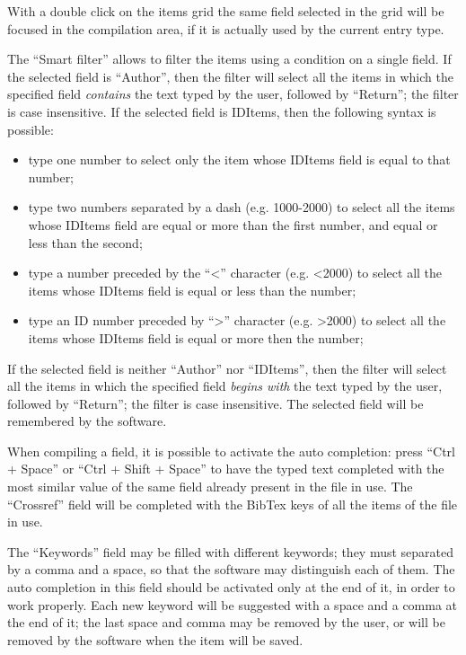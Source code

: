 \documentclass[a4paper,12pt]{report}
\begin{document}
With a double click on the items grid the same field selected in the grid will be focused in the compilation area, if it is actually used by the current entry type.

The “Smart filter” allows to filter the items using a condition on a single field. If the selected field is “Author”, then the filter will select all the items in which the specified field \textit{contains} the text typed by the user, followed by “Return”; the filter is case insensitive. If the selected field is IDItems, then the following syntax is possible:

\begin{itemize}
\item type one number to select only the item whose IDItems field is equal to that number;
\item type two numbers separated by a dash (e.g. 1000-2000) to select all the items whose IDItems field are equal or more than the first number, and equal or less than the second;
\item type a number preceded by the “<” character (e.g. <2000) to select all the items whose IDItems field is equal or less than the number;
\item type an ID number preceded by “>” character (e.g. >2000) to select all the items whose IDItems field is equal or more then the number;
\end{itemize}

If the selected field is neither “Author” nor “IDItems”, then the filter will select all the items in which the specified field \textit{begins with} the text typed by the user, followed by “Return”; the filter is case insensitive. The selected field will be remembered by the software.

When compiling a field, it is possible to activate the auto completion: press “Ctrl + Space” or “Ctrl + Shift + Space” to have the typed text completed with the most similar value of the same field already present in the file in use. The “Crossref” field will be completed with the BibTex keys of all the items of the file in use.

The “Keywords” field may be filled with different keywords; they must separated by a comma and a space, so that the software may distinguish each of them. The auto completion in this field should be activated only at the end of it, in order to work properly. Each new keyword will be suggested with a space and a comma at the end of it; the last space and comma may be removed by the user, or will be removed by the software when the item will be saved. 
\end{document}
